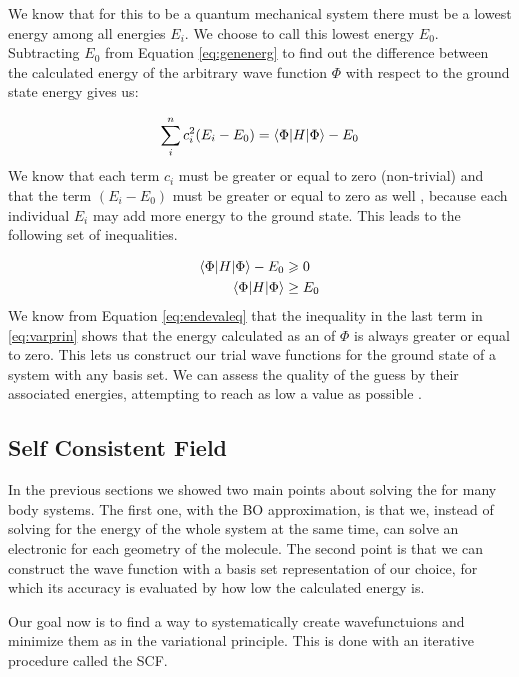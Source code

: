\documentclass[../master_thesis.tex]{subfiles}
\begin{document}
We know that for this to be a quantum mechanical system there must be a lowest
energy among all energies $E_i$. We choose to call this lowest energy $E_0$.
Subtracting $E_0$ from Equation \ref{eq:genenerg} to find out the difference
between the calculated energy of the arbitrary wave function $\Phi$ with respect
to the ground state energy gives us:

\begin{equation}
   \sum\limits_i^nc_i^2(E_i - E_0) = \braket{\Phi | H | \Phi} - E_0
\end{equation}
We know that each term $c_i$ must be greater or equal to zero (non-trivial) and
that the term $(E_i - E_0)$ must be greater or equal to zero as well
\cite{Cramer:2004}, because each individual $E_i$ may add more energy to the
ground state. This leads to the following set of inequalities.

\begin{equation}
  \begin{split} \label{eq:varprin}
    \braket{\Phi | H | \Phi} - E_0 & \geqslant 0 \\
    \braket{\Phi | H | \Phi} & \geq E_0
  \end{split}
\end{equation}
We know from Equation \ref{eq:endevaleq} that the inequality in the last term in
\ref{eq:varprin} shows that the energy calculated as an \eival of $\Phi$ is
always greater or equal to zero. This lets us construct our trial wave functions
for the ground state of a system with any basis set. We can assess the quality
of the guess by their associated energies, attempting to reach as low a value
as possible \cite{Cramer:2004}.

\subsection{Self Consistent Field}
In the previous sections we showed two main points about solving the \SE for
many body systems. The first one, with the \ac{BO} approximation, is that we,
instead of solving for the energy of the whole system at the same time, can solve an electronic
\SE for each geometry of the molecule. The second point is that we can construct
the wave function with a basis set representation of our choice, for which its
accuracy is evaluated by how low the calculated energy is.

Our goal now is to find a way to systematically create wavefunctuions and
minimize them as in the variational principle. This is done with an iterative
procedure called the \ac{SCF}.
\end{document}
